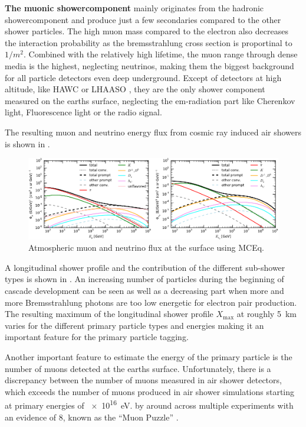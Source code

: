 \textbf{The muonic showercomponent} mainly originates from the hadronic showercomponent and produce just a few secondaries compared to the other shower particles.
The high muon mass compared to the electron also decreases the interaction probability as the bremsstrahlung cross section is proportinal to $1/m^2$.
Combined with the relatively high lifetime, the muon range through dense media is the highest, neglecting neutrinos, making them the biggest background for all particle detectors even deep underground.
Except of detectors at high altitude, like HAWC \cite{HAWC17} or LHAASO \cite{LHAASO19}, they are the only shower component measured on the earths surface, neglecting the em-radiation part like Cherenkov light, Fluorescence light or the radio signal.

The resulting muon and neutrino energy flux from cosmic ray induced air showers is shown in .

\begin{figure}
    \centering
    \includegraphics[width=\textwidth]{./images/mceq_mu_nu_flux.pdf}
    \caption{Atmospheric muon and neutrino flux at the surface using MCEq. \cite{Fedynitch15MCEq}}
    \label{fig:atmo_mu_nu_flux}
\end{figure}

A longitudinal shower profile and the contribution of the different sub-shower types is shown in .
An increasing number of particles during the beginning of cascade development can be seen as well as a decreasing part when more and more Bremsstrahlung photons are too low energetic for electron pair production.
The resulting maximum of the longitudinal shower profile $X_{\mathrm{max}}$ at roughly \SI{5}{km} varies for the different primary particle types and energies making it an important feature for the primary particle tagging.

Another important feature to estimate the energy of the primary particle is the number of muons detected at the earths surface.
Unfortunately, there is a discrepancy between the number of muons measured in air shower detectors, which exceeds the number of muons produced in air shower simulations starting at primary energies of \SI{e16}{eV}.
by around across multiple experiments with an evidence of \SI{8}{\sigma}, known as the \enquote{Muon Puzzle} \cite{Dembinski19MuonPuzzle}.

